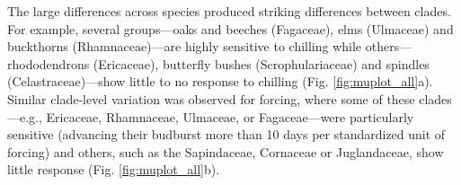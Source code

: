 \documentclass[11pt]{article}
\begin{document}
The large differences across species produced striking differences between clades. For example, several groups---oaks and
beeches (Fagaceae), elms (Ulmaceae) and buckthorns (Rhamnaceae)---are highly sensitive to chilling while others---rhododendrons (Ericaceae), butterfly bushes (Scrophulariaceae) and spindles (Celastraceae)---show little to no response to chilling  (Fig. \ref{fig:muplot_all}a). %
Similar clade-level variation was observed for forcing, where some of these clades---e.g., Ericaceae, Rhamnaceae, Ulmaceae, or Fagaceae---were particularly sensitive (advancing their budburst more than 10 days per standardized unit of forcing) and others, such as the Sapindaceae, Cornaceae or Juglandaceae, show little response (Fig. \ref{fig:muplot_all}b). %
\end{document}
